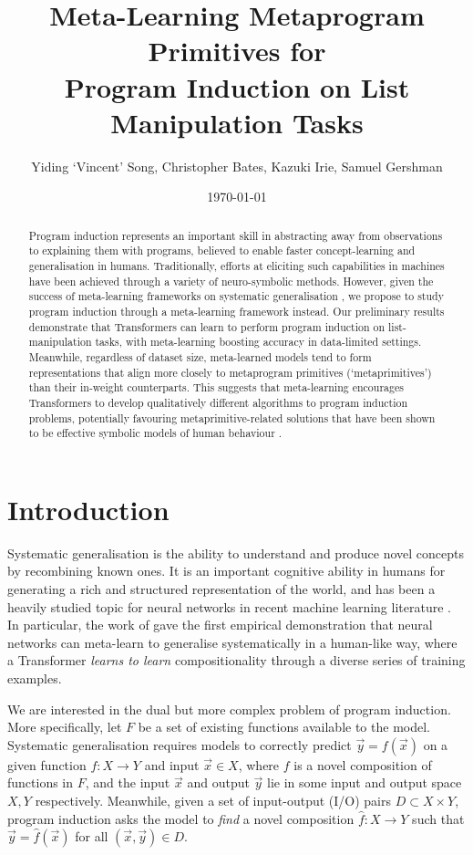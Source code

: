 \documentclass[12pt]{article}
\title{Meta-Learning Metaprogram Primitives for \\ Program Induction on List Manipulation Tasks}
\author{Yiding `Vincent' Song, Christopher Bates, Kazuki Irie, Samuel Gershman}
\date{\today}
\begin{document}
\maketitle

\begin{abstract}
    Program induction represents an important skill in abstracting away from observations to explaining them with programs, believed to enable faster concept-learning and generalisation in humans.
    Traditionally, efforts at eliciting such capabilities in machines have been achieved through a variety of neuro-symbolic methods.
    However, given the success of meta-learning frameworks on systematic generalisation \citep{lake2023human}, we propose to study program induction through a meta-learning framework instead.
    Our preliminary results demonstrate that Transformers can learn to perform program induction on list-manipulation tasks, with meta-learning boosting accuracy in data-limited settings.
    Meanwhile, regardless of dataset size, meta-learned models tend to form representations that align more closely to metaprogram primitives (`metaprimitives') than their in-weight counterparts.
    This suggests that meta-learning encourages Transformers to develop qualitatively different algorithms to program induction problems, potentially favouring metaprimitive-related solutions that have been shown to be effective symbolic models of human behaviour \citep{rule2024symbolic}.
\end{abstract}

\section{Introduction}
\label{sec:introduction}

Systematic generalisation is the ability to understand and produce novel concepts by recombining known ones. It is an important cognitive ability in humans for generating a rich and structured representation of the world, and has been a heavily studied topic for neural networks in recent machine learning literature \citep{drozdov2023compositional, kim2020cogs, lake2018generalization, lake2023human, liang2024diffusion}. In particular, the work of \citet{lake2023human} gave the first empirical demonstration that neural networks can meta-learn to generalise systematically in a human-like way, where a Transformer {\it learns to learn} compositionality through a diverse series of training examples.

We are interested in the dual but more complex problem of program induction. More specifically, let $F$ be a set of existing functions available to the model. Systematic generalisation requires models to correctly predict $\vec{y} = f(\vec{x})$ on a given function $f: X \to Y$ and input $\vec{x} \in X$, where $f$ is a novel composition of functions in $F$, and the input $\vec{x}$ and output $\vec{y}$ lie in some input and output space $X, Y$ respectively. Meanwhile, given a set of input-output (I/O) pairs $D \subset X \times Y$, program induction asks the model to {\it find} a novel composition $\hat{f}: X \to Y$ such that $\vec{y} = \hat{f}(\vec{x})$ for all $(\vec{x}, \vec{y}) \in D$.
\end{document}
